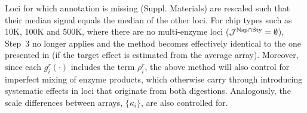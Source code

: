 \documentclass{bioinfo}
\newcommand{\Nsp}{\ensuremath{\textnormal{Nsp}}\xspace}
\newcommand{\Sty}{\ensuremath{\textnormal{Sty}}\xspace}
\begin{document}

Loci for which annotation is missing (Suppl. Materials) are rescaled such that their median signal equals the median of the other loci.
For chip types such as 10K, 100K and 500K, where there are no multi-enzyme loci ($\mathcal{J}^{\Nsp\cap\Sty} = \emptyset$), Step~3 no longer applies and the method becomes effectively identical to the one presented in \citet{BengtssonH_etal_2008a} (if the target effect is estimated from the average array).
Moreover, since each $g^{r}_{i}(\cdot)$ includes the term $\rho^{r}_{i}$, the above method will also control for imperfect mixing of enzyme products, which otherwise carry through introducing systematic effects in loci that originate from both digestions.
Analogously, the scale differences between arrays, $\{\kappa_i\}$, are also controlled for.

\end{document}
